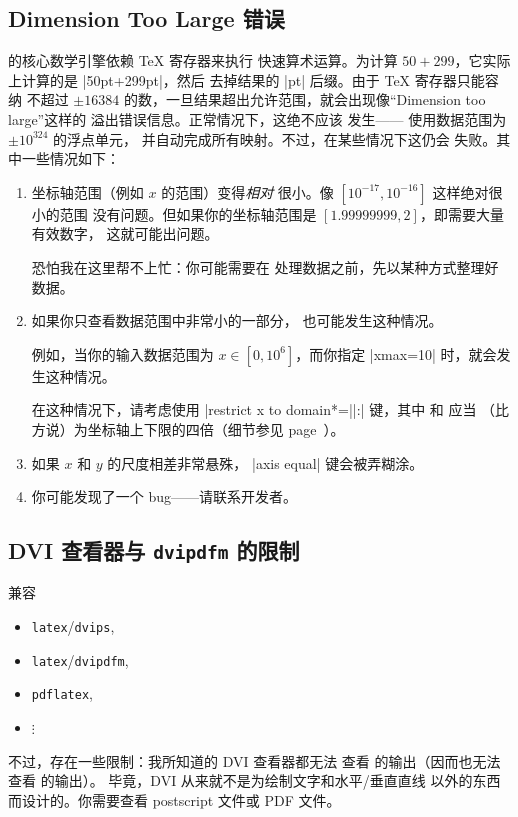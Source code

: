 \subsection{Dimension Too Large 错误}

\PGF{} 的核心数学引擎依赖 \TeX{} 寄存器来执行
快速算术运算。为计算 $50+299$，它实际上计算的是 |50pt+299pt|，然后
去掉结果的 |pt| 后缀。由于 \TeX{} 寄存器只能容纳
不超过 $\pm 16384$ 的数，一旦结果超出允许范围，就会出现像“Dimension too large”这样的
溢出错误信息。正常情况下，这绝不应该
发生——\PGFPlots{} 使用数据范围为 $\pm 10^{324}$ 的浮点单元，
并自动完成所有映射。不过，在某些情况下这仍会
失败。其中一些情况如下：
%
\begin{enumerate}
    \item 坐标轴范围（例如 $x$ 的范围）变得\emph{相对}
        很小。像 $[10^{-17},10^{-16}]$ 这样绝对很小的范围
        没有问题。但如果你的坐标轴范围是
        $[1.99999999,2]$，即需要大量有效数字，
        这就可能出问题。

        恐怕我在这里帮不上忙：你可能需要在
        \PGFPlots{} 处理数据之前，先以某种方式整理好数据。
    \item 如果你只查看数据范围中非常小的一部分，
        也可能发生这种情况。

        例如，当你的输入数据范围为 $x\in
        [0,10^6]$，而你指定 |xmax=10| 时，就会发生这种情况。

        在这种情况下，请考虑使用
        |restrict x to domain*=||:|
        键，其中  和  应当
        （比方说）为坐标轴上下限的四倍（细节参见
        page~\pageref{key:restrict:x:to:domain}）。
    \item 如果 $x$ 和 $y$ 的尺度相差非常悬殊，
        |axis equal| 键会被弄糊涂。
    \item 你可能发现了一个 bug——请联系开发者。
\end{enumerate}


\subsection{DVI 查看器与 \texttt{dvipdfm} 的限制}
\label{sec:drivers}

\PGF{} 兼容
%
\begin{itemize}
    \item \lstinline!latex!/\lstinline!dvips!,
    \item \lstinline!latex!/\lstinline!dvipdfm!,
    \item \lstinline!pdflatex!,
    \item $\vdots$
\end{itemize}
%
不过，存在一些限制：我所知道的 DVI 查看器都无法
查看 \PGF{} 的输出（因而也无法查看 \PGFPlots{} 的输出）。
毕竟，DVI 从来就不是为绘制文字和水平/垂直直线
以外的东西而设计的。你需要查看 postscript 文件或
PDF 文件。

